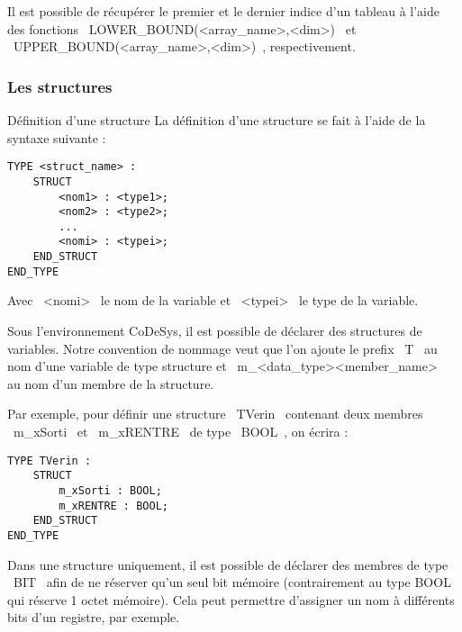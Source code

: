 Il est possible de récupérer le premier et le dernier indice d'un tableau à l'aide des fonctions ~LOWER_BOUND(<array_name>,<dim>)~ et ~UPPER_BOUND(<array_name>,<dim>)~, respectivement.


\subsubsection{Les structures}
\begin{UPSTIinfor}{Définition d'une structure}
    La définition d'une structure se fait à l'aide de la syntaxe suivante : 
    \begin{lstlisting}[language=ST]
TYPE <struct_name> :
    STRUCT
        <nom1> : <type1>;
        <nom2> : <type2>;
        ...
        <nomi> : <typei>;
    END_STRUCT
END_TYPE\end{lstlisting}

    Avec ~<nomi>~ le nom de la variable et ~<typei>~ le type de la variable. 
\end{UPSTIinfor}
Sous l'environnement CoDeSys, il est possible de déclarer des structures de variables. 
Notre convention de nommage veut que l'on ajoute le prefix ~T~ au nom d'une variable de type structure et ~m_<data_type><member_name>~ au nom d'un membre de la structure.

Par exemple, pour définir une structure ~TVerin~ contenant deux membres ~m_xSorti~ et ~m_xRENTRE~ de type ~BOOL~, on écrira : 
\begin{lstlisting}[language=ST]
TYPE TVerin :
    STRUCT
        m_xSorti : BOOL;
        m_xRENTRE : BOOL;
    END_STRUCT
END_TYPE\end{lstlisting}

Dans une structure uniquement, il est possible de déclarer des membres de type ~BIT~ afin de ne réserver qu'un seul bit mémoire (contrairement au type BOOL qui réserve 1 octet mémoire). Cela peut permettre d'assigner un nom à différents bits d'un registre, par exemple. 

